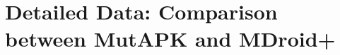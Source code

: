 
\chapter{Detailed Data: Comparison between MutAPK and MDroid+} %

\label{AppendixA} %

%
%
%
%
%
%
%
%
%

